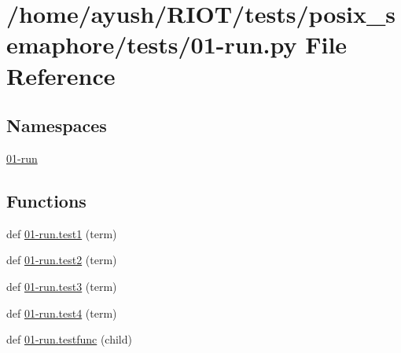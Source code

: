 \hypertarget{posix__semaphore_2tests_201-run_8py}{}\section{/home/ayush/\+R\+I\+O\+T/tests/posix\+\_\+semaphore/tests/01-\/run.py File Reference}
\label{posix__semaphore_2tests_201-run_8py}
\subsection*{Namespaces}
\begin{DoxyCompactItemize}
\item 
 \hyperlink{namespace01-run}{01-\/run}
\end{DoxyCompactItemize}
\subsection*{Functions}
\begin{DoxyCompactItemize}
\item 
def \hyperlink{namespace01-run_a06344429edc2313358f59b0e501f1ae5}{01-\/run.\+test1} (term)
\item 
def \hyperlink{namespace01-run_ada98d444a3fe857d31d3d37e9f356d8e}{01-\/run.\+test2} (term)
\item 
def \hyperlink{namespace01-run_a257feca6e1f04f60b7588f885a4a4467}{01-\/run.\+test3} (term)
\item 
def \hyperlink{namespace01-run_accc621a2eeba8d4a50746f6737268706}{01-\/run.\+test4} (term)
\item 
def \hyperlink{namespace01-run_aff983ffd4ab0e6bf8e7e58970e4a10bb}{01-\/run.\+testfunc} (child)
\end{DoxyCompactItemize}
